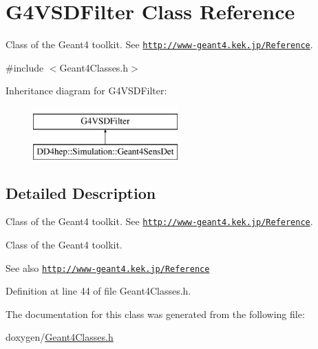 \hypertarget{class_g4_v_s_d_filter}{}\section{G4\+V\+S\+D\+Filter Class Reference}
\label{class_g4_v_s_d_filter}


Class of the Geant4 toolkit. See \href{http://www-geant4.kek.jp/Reference}{\tt http\+://www-\/geant4.\+kek.\+jp/\+Reference}.  




{\ttfamily \#include $<$Geant4\+Classes.\+h$>$}

Inheritance diagram for G4\+V\+S\+D\+Filter\+:\begin{figure}[H]
\begin{center}
\leavevmode
\includegraphics[height=2.000000cm]{class_g4_v_s_d_filter}
\end{center}
\end{figure}


\subsection{Detailed Description}
Class of the Geant4 toolkit. See \href{http://www-geant4.kek.jp/Reference}{\tt http\+://www-\/geant4.\+kek.\+jp/\+Reference}. 

Class of the Geant4 toolkit. \begin{DoxySeeAlso}{See also}
\href{http://www-geant4.kek.jp/Reference}{\tt http\+://www-\/geant4.\+kek.\+jp/\+Reference} 
\end{DoxySeeAlso}


Definition at line 44 of file Geant4\+Classes.\+h.



The documentation for this class was generated from the following file\+:\begin{DoxyCompactItemize}
\item 
doxygen/\hyperlink{_geant4_classes_8h}{Geant4\+Classes.\+h}\end{DoxyCompactItemize}
